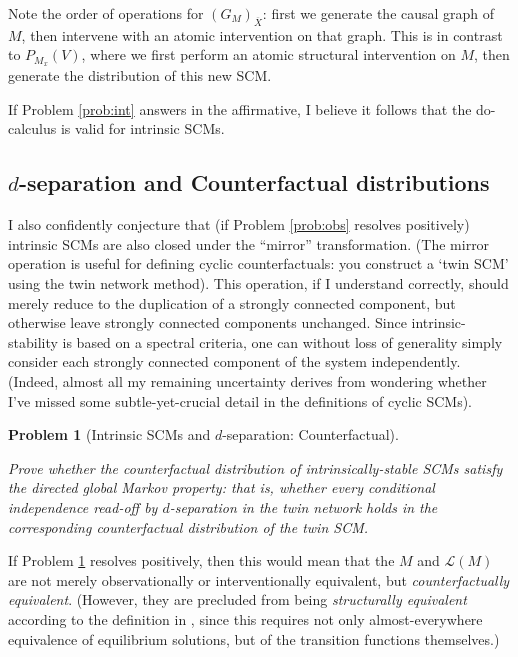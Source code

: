 \documentclass[letterpaper,10pt]{article}
\newtheorem{problem}{Problem}
\begin{document}
Note the order of operations for $(G_M)_{\overline{X}}$: first we generate the causal graph of $M$, then intervene with an atomic intervention on that graph. This is in contrast to $P_{M_x}(V)$, where we first perform an atomic structural intervention on $M$, then generate the distribution of this new SCM.

If Problem \ref{prob:int} answers in the affirmative, I believe it follows that the do-calculus is valid for intrinsic SCMs.

\subsection{$d$-separation and Counterfactual distributions}

I also confidently conjecture that (if Problem \ref{prob:obs} resolves positively) intrinsic SCMs are also closed under the “mirror” transformation.
(The mirror operation is useful for defining cyclic counterfactuals: you construct a `twin SCM' using the twin network method). 
This operation, if I understand correctly, should merely reduce to the duplication of a strongly connected component, but otherwise leave strongly connected components unchanged. Since intrinsic-stability is based on a spectral criteria, one can without loss of generality simply consider each strongly connected component of the system independently. (Indeed, almost all my remaining uncertainty derives from wondering whether I've missed some subtle-yet-crucial detail in the definitions of cyclic SCMs).

\begin{problem}[Intrinsic SCMs and $d$-separation: Counterfactual]
\label{prob:count}

Prove whether the counterfactual distribution of intrinsically-stable SCMs satisfy the directed global Markov property: that is, whether every conditional independence read-off by $d$-separation in the twin network holds in the corresponding counterfactual distribution of the twin SCM.
\end{problem}

If Problem \ref{prob:count} resolves positively, then this would mean that the $M$ and $\mathcal{L}(M)$ are not merely observationally or interventionally equivalent, but \emph{counterfactually equivalent}. (However, they are precluded from being \emph{structurally equivalent} according to the definition in \cite{Foundations}, since this requires not only almost-everywhere equivalence of equilibrium solutions, but of the transition functions themselves.)
\end{document}
